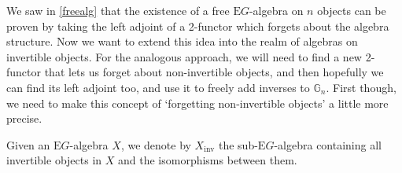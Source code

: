 We saw in \cref{freealg} that the existence of a free $\mathrm{E}G$-algebra on $n$ objects can be proven by taking the left adjoint of a 2-functor which forgets about the algebra structure. Now we want to extend this idea into the realm of algebras on invertible objects. For the analogous approach, we will need to find a new 2-functor that lets us forget about non-invertible objects, and then hopefully we can find its left adjoint too, and use it to freely add inverses to $\mathbb{G}_n$. First though, we need to make this concept of `forgetting non-invertible objects' a little more precise.

\begin{defn} Given an $\mathrm{E}G$-algebra $X$, we denote by $X_{\mathrm{inv}}$ the sub-$\mathrm{E}G$-algebra containing all invertible objects in $X$ and the isomorphisms between them. \end{defn}

